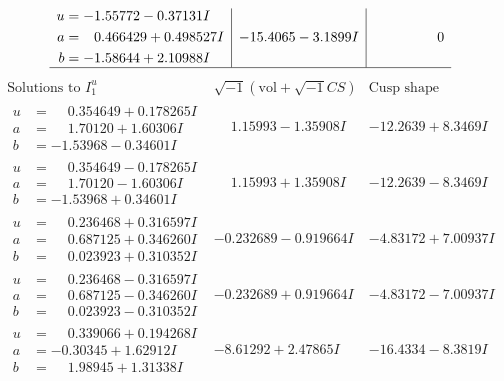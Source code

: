 \documentclass[1p]{elsarticle_modified}
\theoremstyle{definition}
\newcommand{\I}{\sqrt{-1}}
\begin{document}
$$\begin{array}{c|c|c}
\begin{aligned}
u &= -1.55772 - 0.37131 I \\
a &= \phantom{-}0.466429 + 0.498527 I \\
b &= -1.58644 + 2.10988 I\end{aligned}
 & -15.4065 - 3.1899 I & \phantom{-0.000000 } 0\\
 \hline 
 \end{array}$$\newpage$$\begin{array}{c|c|c}  
\text{Solutions to }I^u_{1}& \I (\text{vol} + \sqrt{-1}CS) & \text{Cusp shape}\\
 \hline 
\begin{aligned}
u &= \phantom{-}0.354649 + 0.178265 I \\
a &= \phantom{-}1.70120 + 1.60306 I \\
b &= -1.53968 - 0.34601 I\end{aligned}
 & \phantom{-}1.15993 - 1.35908 I & -12.2639 + 8.3469 I \\ \hline\begin{aligned}
u &= \phantom{-}0.354649 - 0.178265 I \\
a &= \phantom{-}1.70120 - 1.60306 I \\
b &= -1.53968 + 0.34601 I\end{aligned}
 & \phantom{-}1.15993 + 1.35908 I & -12.2639 - 8.3469 I \\ \hline\begin{aligned}
u &= \phantom{-}0.236468 + 0.316597 I \\
a &= \phantom{-}0.687125 + 0.346260 I \\
b &= \phantom{-}0.023923 + 0.310352 I\end{aligned}
 & -0.232689 - 0.919664 I & -4.83172 + 7.00937 I \\ \hline\begin{aligned}
u &= \phantom{-}0.236468 - 0.316597 I \\
a &= \phantom{-}0.687125 - 0.346260 I \\
b &= \phantom{-}0.023923 - 0.310352 I\end{aligned}
 & -0.232689 + 0.919664 I & -4.83172 - 7.00937 I \\ \hline\begin{aligned}
u &= \phantom{-}0.339066 + 0.194268 I \\
a &= -0.30345 + 1.62912 I \\
b &= \phantom{-}1.98945 + 1.31338 I\end{aligned}
 & -8.61292 + 2.47865 I & -16.4334 - 8.3819 I \\ \hline\begin{aligned}

\end{aligned}
\end{array}$$
\end{document}
